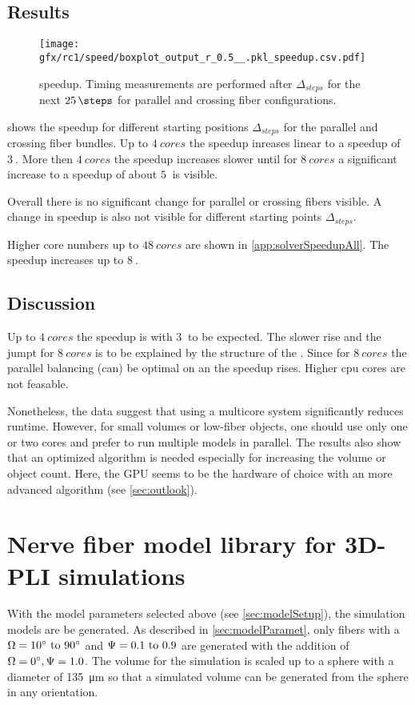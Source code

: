 \subsection{Results}
% 
\begin{figure}[!t]
\centering
\texttt{[image: gfx/rc1/speed/boxplot\_output\_r\_0.5\_\_.pkl\_speedup.csv.pdf]}
\caption{ speedup. Timing measurements are performed after $\Delta_{\mathit{steps}}$ for the next $\SI{25}{\steps}$ for parallel \pfbs{} and crossing \cfbs{} fiber configurations.}
\label{fig:solverSpeedup}
\end{figure}
% 
 shows the speedup for different starting positions $\Delta_{\mathit{steps}}$ for the parallel \pfbs{} and crossing \cfbs{} fiber bundles.
Up to $\SI{4}{cores}$ the speedup inreases linear to a speedup of $\SI{3}{}$.
More then $\SI{4}{cores}$ the speedup increases slower until for $\SI{8}{cores}$ a significant increase to a speedup of about $\SI{5}{}$ is visible.
\par
% 
Overall there is no significant change for parallel or crossing fibers visible.
A change in speedup is also not visible for different starting points $\Delta_{\mathit{steps}}$.
\par
% 
Higher core numbers up to $\SI{48}{cores}$ are shown in \cref{app:solverSpeedupAll}.
The speedup increases up to $\SI{8}{}$.
% 
% 
% 
\subsection{Discussion}
% 
Up to $\SI{4}{cores}$ the speedup is with $\SI{3}{}$ to be expected.
The slower rise and the jumpt for $\SI{8}{cores}$ is to be explained by the structure of the .
Since for $\SI{8}{cores}$ the parallel balancing (can) be optimal on an  the speedup rises.
Higher cpu cores are not feasable.
\par
% 
Nonetheless, the data suggest that using a multicore system significantly reduces runtime.
However, for small volumes or low-fiber objects, one should use only one or two cores and prefer to run multiple models in parallel.
The results also show that an optimized algorithm is needed especially for increasing the volume or object count.
Here, the \ac{GPU} seems to be the hardware of choice with an more advanced algorithm \cite{Karras2012} (see \cref{sec:outlook}).
% 
%
%
\section{Nerve fiber model library for \acs{3D-PLI} simulations}
%
With the model parameters selected above (see \cref{sec:modelSetup}), the simulation models are be generated.
As described in \cref{sec:modelParamet}, only fibers with a $\modelOmega = \SIrange{10}{90}{\degree}$ and $\modelPsi = \SIrange{0.1}{0.9}{}$ are generated with the addition of $\textnormal{$\Omega$}=\SI{0}{\degree}, \textnormal{$\Psi$}=\SI{1.0}{}$.
The volume for the simulation is scaled up to a sphere with a diameter of \SI{135}{\micro\meter} so that a simulated volume can be generated from the sphere in any orientation.
% 
%
%
